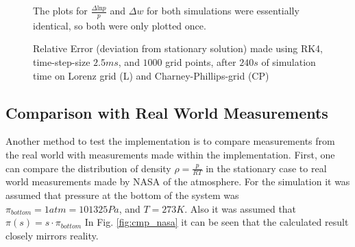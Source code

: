 \begin{figure}[!h]
    \caption{Relative Error (deviation from stationary solution) made using RK4, time-step-size $2.5ms$, and $1000$ grid points, after $240s$ of simulation time on Lorenz grid (L) and Charney-Phillips-grid (CP)}
  	\small
The plots for $\frac{\Delta \text{ln}p}{p}$ and $\Delta w$ for both simulations were essentially identical, so both were only plotted once.
    \label{fig:lorenz_stat_err}
    
\end{figure}

\subsection{Comparison with Real World Measurements}
Another method to test the implementation is to compare measurements from the real world with measurements made within the implementation.
First, one can compare the distribution of density $\rho=\frac{p}{RT}$ in the stationary case to real world measurements made by NASA \cite{larson1963stratosphere} of the atmosphere.
For the simulation it was assumed that pressure at the bottom of the system was $\pi_{bottom}=1atm=101325 Pa$, and $T=273K$.
Also it was assumed that $\pi (s) = s\cdot\pi_{bottom}$
In Fig. \ref{fig:cmp_nasa} it can be seen that the calculated result closely mirrors reality.


